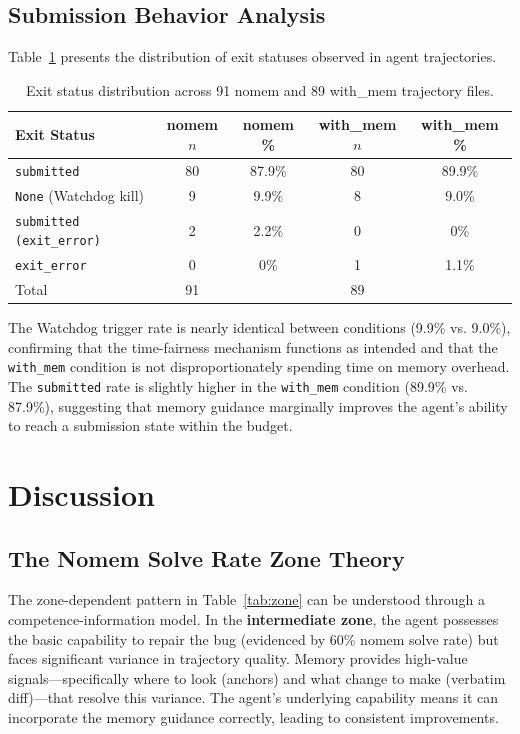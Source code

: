 \documentclass{article}
\begin{document}
\subsection{Submission Behavior Analysis}

Table~\ref{tab:exit} presents the distribution of exit statuses observed in agent trajectories.

\begin{table}[h]
\centering
\caption{Exit status distribution across 91 nomem and 89 with\_mem trajectory files.}
\label{tab:exit}
\begin{tabular}{lcccc}
\toprule
\textbf{Exit Status} & \textbf{nomem $n$} & \textbf{nomem \%} & \textbf{with\_mem $n$} & \textbf{with\_mem \%} \\
\midrule
\texttt{submitted} & 80 & 87.9\% & 80 & 89.9\% \\
\texttt{None} (Watchdog kill) & 9 & 9.9\% & 8 & 9.0\% \\
\texttt{submitted (exit\_error)} & 2 & 2.2\% & 0 & 0\% \\
\texttt{exit\_error} & 0 & 0\% & 1 & 1.1\% \\
\midrule
Total & 91 & & 89 & \\
\bottomrule
\end{tabular}
\end{table}

The Watchdog trigger rate is nearly identical between conditions (9.9\% vs. 9.0\%), confirming that the time-fairness mechanism functions as intended and that the \texttt{with\_mem} condition is not disproportionately spending time on memory overhead. The \texttt{submitted} rate is slightly higher in the \texttt{with\_mem} condition (89.9\% vs. 87.9\%), suggesting that memory guidance marginally improves the agent's ability to reach a submission state within the budget.

\section{Discussion}

\subsection{The Nomem Solve Rate Zone Theory}

The zone-dependent pattern in Table~\ref{tab:zone} can be understood through a competence-information model. In the \textbf{intermediate zone}, the agent possesses the basic capability to repair the bug (evidenced by 60\% nomem solve rate) but faces significant variance in trajectory quality. Memory provides high-value signals---specifically where to look (anchors) and what change to make (verbatim diff)---that resolve this variance. The agent's underlying capability means it can incorporate the memory guidance correctly, leading to consistent improvements.
\end{document}
